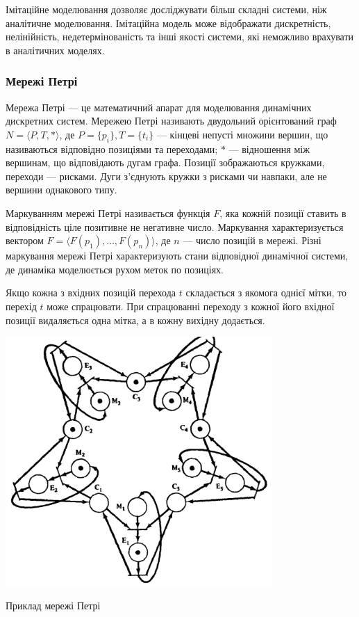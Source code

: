 Імітаційне моделювання дозволяє досліджувати більш складні системи, ніж аналітичне моделювання. Імітаційна модель може відображати дискретність, нелінійність, недетермінованість та інші якості системи, які неможливо врахувати в аналітичних моделях. 

\subsubsection{Мережі Петрі}
Мережа Петрі --- це математичний апарат для моделювання динамічних дискретних систем. Мережею Петрі називають двудольний орієнтований граф \mbox {$ N = \langle P, T, * \rangle $}, де \mbox{$ P = \{p_i\}, T = \{t_i\} $} --- кінцеві непусті множини вершин, що називаються відповідно позиціями та переходами; $*$ --- відношення між вершинам, що відповідають дугам графа. Позиції зображаються кружками, переходи --- рисками. Дуги з’єднують кружки з рисками чи навпаки, але не вершини однакового типу.

Маркуванням мережі Петрі називається функція $F$, яка кожній позиції ставить в відповідність ціле позитивне не негативне число. Маркування характеризується вектором \mbox{$ F = \langle F(p_1), \dots, F(p_n) \rangle $}, де $n$ --- число позицій в мережі.
Різні маркування мережі Петрі характеризують стани відповідної динамічної системи, де динаміка моделюється рухом меток по позиціях.

Якщо кожна з вхідних позицій перехода $t$ складається з якомога однієї мітки, то перехід $t$ може спрацювати. При спрацюванні переходу з кожної його вхідної позиції видаляється одна мітка, а в кожну вихідну додається.
            \begin{stdfigure}
                \includegraphics[width=4in]{images/petri_net_example.png}
                \caption{Приклад мережі Петрі}
                \label{fig:petri_net_example}
            \end{stdfigure}   

